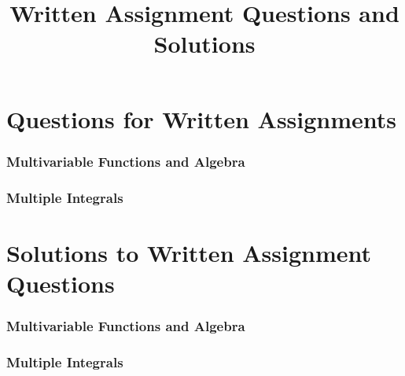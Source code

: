\documentclass{article}
\title{Written Assignment Questions and Solutions}
\date{}
\author{}
\begin{document}
\maketitle
\tableofcontents 

\newpage
\part{Questions for Written Assignments}

\setcounter{section}{1}

\section{Multivariable Functions and Algebra}





%
\section{Multiple Integrals}


\newpage
\part{Solutions to Written Assignment Questions}
\setcounter{section}{1}

\section{Multivariable Functions and Algebra}




\newpage


\section{Multiple Integrals}

\end{document}
